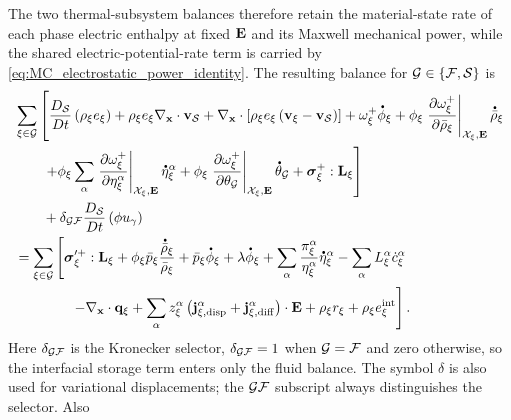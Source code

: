The two thermal-subsystem balances therefore retain the material-state rate of
each phase electric enthalpy at fixed \(\mathbf{E}\) and its Maxwell mechanical
power, while the shared electric-potential-rate term is carried by
\eqref{eq:MC_electrostatic_power_identity}.  The resulting balance for
\(\mathcal{G}\in\{\mathcal{F},\mathcal{S}\}\) is
%
\begin{equation}
	\begin{aligned}
		 & \sum_{\xi\in\mc G}
			\left[
				\frac{D_{\mc S}}{Dt}
				\left(
				\rho_\xi e_\xi
				\right)
				+
				\rho_\xi e_\xi
				\nabla_{\mbf x}\cdot\mbf v_{\mc S}
				+
				\nabla_{\mbf x}\cdot
				\left[
					\rho_\xi e_\xi
					\left(
					\mbf v_\xi-\mbf v_{\mc S}
					\right)
				\right]
				+
				\omega_\xi^+\phasedot\phi_\xi
			+
			\phi_\xi
			\left.
			\p{\omega_\xi^+}{\bar\rho_\xi}
			\right\vert_{\mc X_\xi,\mbf E}
			\phasedot{\bar\rho}_\xi
			\right.
		\\
		 & \qquad
			\left.
			+
			\phi_\xi
			\sum_\alpha
			\left.
			\p{\omega_\xi^+}{\eta_\xi^\alpha}
			\right\vert_{\mc X_\xi,\mbf E}
			\phasedot\eta_\xi^\alpha
			+
			\phi_\xi
			\left.
			\p{\omega_\xi^+}{\theta_{\mc G}}
			\right\vert_{\mc X_\xi,\mbf E}
			\phasedot\theta_{\mc G}
			+
			\bs\sigma_\xi^+:\mbf L_\xi
			\right]
		\\
		 & \qquad
		+
		\delta_{\mc G\mc F}
		\frac{D_{\mc S}}{Dt}
		\left(
		\phi u_\gamma
		\right)
		\\
		 & =
		\sum_{\xi\in\mc G}
		\left[
			\bs\sigma_\xi^{\prime+}:\mbf L_\xi
			+
			\phi_\xi\bar p_\xi
			\frac{\phasedot{\bar\rho}_\xi}{\bar\rho_\xi}
			+
			\bar p_\xi\phasedot\phi_\xi
			+
			\lambda\phasedot\phi_\xi
			+
			\sum_\alpha
			\frac{\pi_\xi^\alpha}{\eta_\xi^\alpha}
			\phasedot\eta_\xi^\alpha
			-
			\sum_\alpha L_\xi^\alpha\dot{c}_\xi^\alpha
			\right.
		\\
		 & \left.
			\qquad\qquad
			-
			\nabla_{\mbf x}\cdot
			\mbf q_\xi
			+
			\sum_\alpha z_\xi^\alpha
			\left(
				\mbf j_{\xi,{\rm disp}}^\alpha
				+
				\mbf j_{\xi,{\rm diff}}^\alpha
			\right)\cdot\mbf E
			+
			\rho_\xi r_\xi
			+
			\rho_\xi e_\xi^{\rm int}
			\right].
	\end{aligned}
	\label{eq:MC_energy_balance}
\end{equation}
%
Here \(\delta_{\mathcal{G}\mathcal{F}}\) is the Kronecker selector,
\(\delta_{\mathcal{G}\mathcal{F}}=1\) when \(\mathcal{G}=\mathcal{F}\) and zero otherwise, so the
interfacial storage term enters only the fluid balance.  The symbol \(\delta\)
is also used for variational displacements; the \(\mathcal{G}\mathcal{F}\) subscript always
distinguishes the selector.  Also
